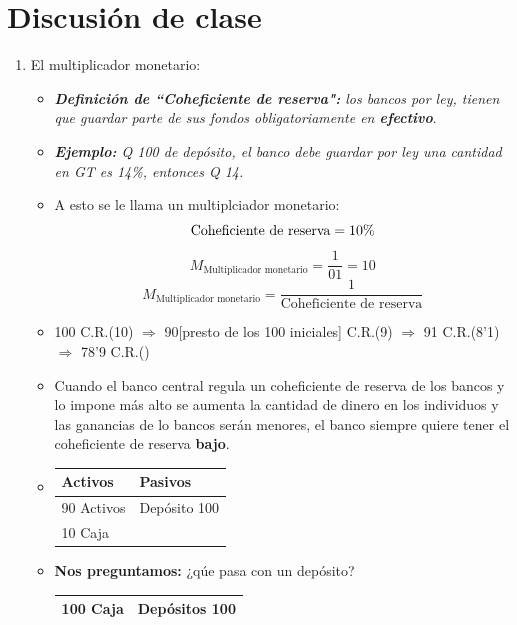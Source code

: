 \section{Discusión de clase}
\begin{enumerate}
    \item El multiplicador monetario:  
        \begin{itemize}
            \item \emph{\textbf{Definición de ``Coheficiente de reserva":} los bancos por ley, tienen que guardar parte de sus fondos obligatoriamente en \textbf{efectivo}}.
            \item \emph{\textbf{Ejemplo: } Q 100 de depósito, el banco debe guardar por ley una cantidad en GT es 14\%, entonces Q 14.}
            \item A esto se le llama un multiplciador monetario: 
                \[
                  \text{\text{Coheficiente de reserva}} = 10\% 
                \]
                \[
                  M_{\text{Multiplicador monetario}} = \frac{1}{01} = 10
                \]
                \[
                  M_{\text{Multiplicador monetario}} = \frac{1}{\text{Coheficiente de reserva}}
                \]

            \item 100 C.R.(10) $\Rightarrow$ 90[presto de los 100 iniciales] C.R.(9) $\Rightarrow$ 91 C.R.(8'1) $\Rightarrow$ 78'9 C.R.()
            \item Cuando el banco central regula un coheficiente de reserva de los bancos y lo impone más alto se aumenta la cantidad de dinero en los individuos y las ganancias de lo bancos serán menores, el banco siempre quiere tener el coheficiente de reserva \textbf{bajo}.
            \item  \begin{tabular}{ | p{7cm} | p{7cm} | }
               \hline
                    Activos & Pasivos  \\
               \hline
                    90 Activos & Depósito 100 \\
                    10 Caja & \\
               \hline
            \end{tabular}
            
            \item \textbf{Nos preguntamos:} ¿qúe pasa con un depósito? 
            \begin{center}
            \begin{tabular}{ | p{7cm} | p{7cm} | }
               \hline
                    100 Caja & Depósitos 100 \\ 
                \hline
            \end{tabular}
            \end{center}    


\end{itemize}
\end{enumerate}
